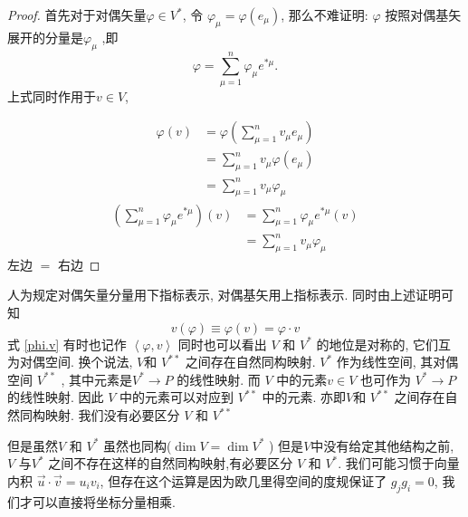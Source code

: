 \documentclass[UTF8]{ctexart}
\theoremstyle{definition}
\begin{document}
\begin{proof}
  首先对于对偶矢量$ \varphi \in V^* $, 令 $ \varphi_\mu = \varphi (e_\mu) $, 那么不难证明: $ \varphi $ 按照对偶基矢展开的分量是$ \varphi_\mu $ ,即
  \[
  \varphi = \sum_{\mu = 1}^{n} \varphi_\mu e^{*\mu}
  .\]
  上式同时作用于$ v \in V $,

  \begin{equation}
  \begin{aligned}
    \varphi(v)&=\varphi(\sum_{\mu =1}^{n} v_\mu e_\mu ) \\
     &= \sum_{\mu =1}^{n} v_\mu \varphi(e_\mu ) \\
     &=  \sum_{\mu =1}^{n} v_\mu \varphi_\mu
  \end{aligned}
  \end{equation}
  \begin{equation}
  \begin{aligned}
    (\sum_{\mu =1}^{n} \varphi_\mu e^{*\mu })(v) &= \sum_{\mu =1}^{n} \varphi_\mu e^{*\mu }(v) \\
     &=  \sum_{\mu =1}^{n} v_\mu \varphi_\mu
  \end{aligned}
  \end{equation}
  左边 $=$ 右边
\end{proof}
人为规定对偶矢量分量用下指标表示, 对偶基矢用上指标表示.
同时由上述证明可知
\begin{equation}
  v(\varphi) \equiv \varphi(v) = \varphi \cdot v   \label{phi.v}
\end{equation}
式 \eqref{phi.v} 有时也记作 $  \left \langle \varphi, v  \right \rangle $
同时也可以看出 $ V $  和 $ V^* $ 的地位是对称的, 它们互为对偶空间. 换个说法, $ V $和 $ V^{**} $ 之间存在自然同构映射.
$ V^* $ 作为线性空间, 其对偶空间 $ V^{**} $  , 其中元素是$ V^* \to P $  的线性映射. 而 $ V $ 中的元素$ v \in V $  也可作为 $ V^* \to P $ 的线性映射. 因此 $ V $ 中的元素可以对应到 $ V^{* *} $ 中的元素. 亦即$ V $和 $ V^{**} $ 之间存在自然同构映射. 我们没有必要区分 $ V $ 和 $ V^{* *} $

但是虽然$ V $ 和 $ V^{*} $ 虽然也同构($ \dim V = \dim V^* $ ) 但是$ V $中没有给定其他结构之前, $ V $ 与$ V^* $ 之间不存在这样的自然同构映射,有必要区分  $ V $ 和 $ V^{*} $.
我们可能习惯于向量内积 $ \vec{u}  \cdot \vec{v}  = u_i v_i $, 但存在这个运算是因为欧几里得空间的度规保证了 $ g_j g_i = 0 $, 我们才可以直接将坐标分量相乘.
\end{document}
